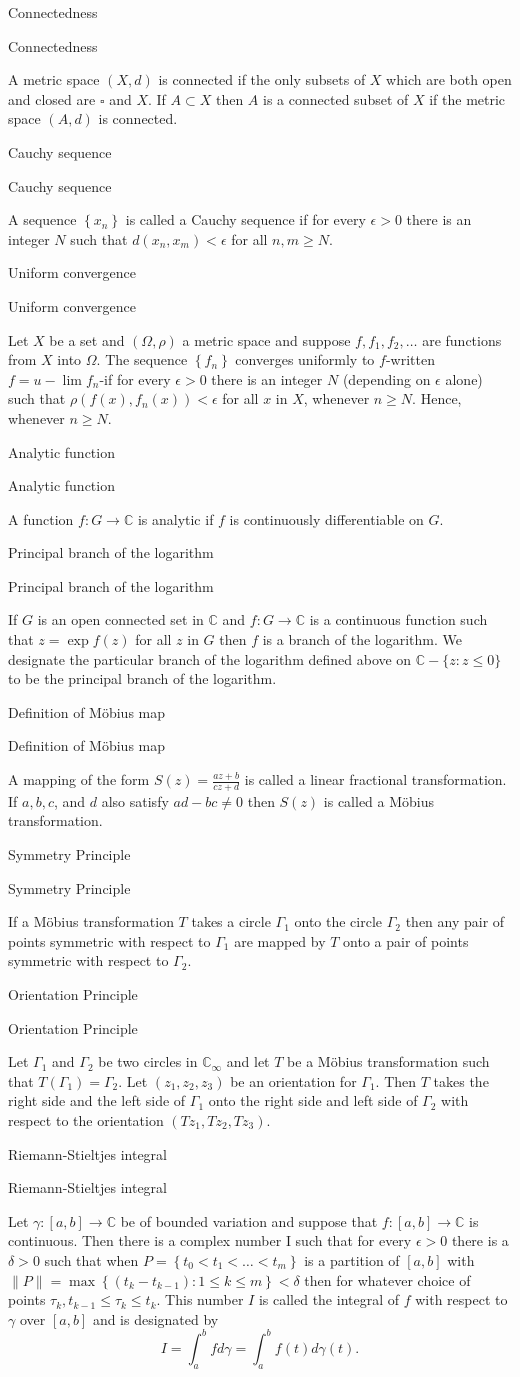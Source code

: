 \documentclass[17pt]{extarticle}
\newcommand{\boxset}[2]{\begin{mdframed}[style=darkQuesion]
  #1
    \end{mdframed}
    \newpage
    \begin{mdframed}[style=darkQuesion]
      #1
        \end{mdframed}
    \begin{mdframed}[style=darkAnswer]
      #2
        \end{mdframed}
        \newpage
  }
\begin{document}
\par
\newpage
\boxset{Connectedness}
{ A metric space $(X, d)$ is connected if the only subsets of $X$ which are both open and closed are $\square$ and $X$. If $A \subset X$ then $A$ is a connected subset of $X$ if the metric space $(A, d)$ is connected.}
\boxset{Cauchy sequence}
{ A sequence $\left\{x_{n}\right\}$ is called a Cauchy sequence if for every $\epsilon>0$ there is an integer $N$ such that $d\left(x_{n}, x_{m}\right)<\epsilon$ for all $n, m \geq N$.}
\boxset{Uniform convergence}
{Let $X$ be a set and $(\Omega, \rho)$ a metric space and suppose $f, f_{1}, f_{2}, \ldots$ are functions from $X$ into $\Omega$. The sequence $\left\{f_{n}\right\}$ converges uniformly to $f$-written $f=u-\lim f_{n}$-if for every $\epsilon>0$ there is an integer $N$ (depending on $\epsilon$ alone) such that $\rho\left(f(x), f_{n}(x)\right)<\epsilon$ for all $x$ in $X$, whenever $n \geq N$. Hence, whenever $n \geq N$.}
\boxset{Analytic function}
{ A function $f: G \rightarrow \mathbb{C}$ is analytic if $f$ is continuously differentiable on $G$.}
\boxset{Principal branch of the logarithm}
{ If $G$ is an open connected set in $\mathbb{C}$ and $f: G \rightarrow \mathbb{C}$ is a continuous function such that $z=\exp f(z)$ for all $z$ in $G$ then $f$ is a branch of the logarithm.
We designate the particular branch of the logarithm defined above on $\mathbb{C}-\{z: z \leq 0\}$ to be the principal branch of the logarithm.}
\boxset{Definition of Möbius map}
{ A mapping of the form $S(z)=\frac{a z+b}{c z+d}$ is called a linear fractional transformation. If $a, b, c$, and $d$ also satisfy $a d-b c \neq 0$ then $S(z)$ is called a Möbius transformation.}
\boxset{Symmetry Principle}
{ If a Möbius transformation $T$ takes a circle $\Gamma_{1}$ onto the circle $\Gamma_{2}$ then any pair of points symmetric with respect to $\Gamma_{1}$ are mapped by $T$ onto a pair of points symmetric with respect to $\Gamma_{2}$.}
\boxset{Orientation Principle}
{ Let $\Gamma_{1}$ and $\Gamma_{2}$ be two circles in $\mathbb{C}_{\infty}$ and let $T$ be a Möbius transformation such that $T\left(\Gamma_{1}\right)=\Gamma_{2}$. Let $\left(z_{1}, z_{2}, z_{3}\right)$ be an orientation for $\Gamma_{1}$. Then $T$ takes the right side and the left side of $\Gamma_{1}$ onto the right side and left side of $\Gamma_{2}$ with respect to the orientation $\left(T z_{1}, T z_{2}, T z_{3}\right)$.}
\boxset{Riemann-Stieltjes integral}
{ Let $\gamma:[a, b] \rightarrow \mathbb{C}$ be of bounded variation and suppose that $f:[a, b] \rightarrow \mathbb{C}$ is continuous. Then there is a complex number I such that for every $\epsilon>0$ there is a $\delta>0$ such that when $P=\left\{t_{0}<t_{1}<\ldots<t_{m}\right\}$ is a partition of $[a, b]$ with $\|P\|=\max \left\{\left(t_{k}-t_{k-1}\right): 1 \leq k \leq m\right\}<\delta$ then
for whatever choice of points $\tau_{k}, t_{k-1} \leq \tau_{k} \leq t_{k}$.
This number $I$ is called the integral of $f$ with respect to $\gamma$ over $[a, b]$ and is designated by
\[I=\int_{a}^{b} f d \gamma=\int_{a}^{b} f(t) d \gamma(t) .\]
}
\end{document}
